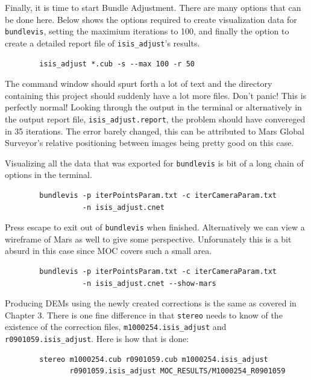 Finally, it is time to start Bundle Adjustment. There are many options
that can be done here. Below shows the options required to create
visualization data for \texttt{bundlevis}, setting the maximium
iterations to 100, and finally the option to create a detailed report
file of \texttt{isis\_adjust}'s results.

\begin{verbatim}
        isis_adjust *.cub -s --max 100 -r 50
\end{verbatim}

The command window should spurt forth a lot of text and the directory
containing this project should suddenly have a lot more files. Don't
panic! This is perfectly normal! Looking through the output in the
terminal or alternatively in the output report file,
\verb=isis_adjust.report=, the problem should have convereged in 35
iterations. The error barely changed, this can be attributed to Mars
Global Surveyor's relative positioning between images being pretty
good on this case.

Visualizing all the data that was exported for \texttt{bundlevis} is bit of a
long chain of options in the terminal.

\begin{verbatim}
        bundlevis -p iterPointsParam.txt -c iterCameraParam.txt 
                  -n isis_adjust.cnet
\end{verbatim}

Press escape to exit out of \texttt{bundlevis} when
finished. Alternatively we can view a wireframe of Mars as well to
give some perspective. Unforunately this is a bit absurd in this case
since MOC covers such a small area.

\begin{verbatim}
        bundlevis -p iterPointsParam.txt -c iterCameraParam.txt
                  -n isis_adjust.cnet --show-mars
\end{verbatim}

Producing DEMs using the newly created corrections is the same as
covered in Chapter 3. There is one fine difference in that
\texttt{stereo} needs to know of the existence of the correction
files, \verb=m1000254.isis_adjust= and
\verb=r0901059.isis_adjust=. Here is how that is done:

\begin{verbatim}
        stereo m1000254.cub r0901059.cub m1000254.isis_adjust
               r0901059.isis_adjust MOC_RESULTS/M1000254_R0901059
\end{verbatim}

